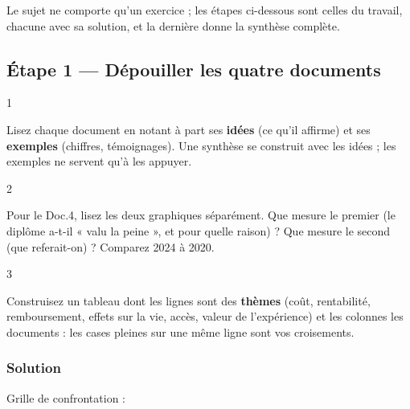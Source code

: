 \documentclass[11pt,a4paper]{article}
\begin{document}
Le sujet ne comporte qu'un exercice ; les étapes ci-dessous sont celles du travail, chacune avec sa solution, et la dernière donne la synthèse complète.

\hypertarget{uxe9tape-1-duxe9pouiller-les-quatre-documents}{%
\subsection{Étape 1 --- Dépouiller les quatre documents}\label{uxe9tape-1-duxe9pouiller-les-quatre-documents}}

\begin{indication}{1}

Lisez chaque document en notant à part ses \textbf{idées} (ce qu'il affirme) et ses \textbf{exemples} (chiffres, témoignages). Une synthèse se construit avec les idées ; les exemples ne servent qu'à les appuyer.

\end{indication}

\begin{indication}{2}

Pour le Doc.4, lisez les deux graphiques séparément. Que mesure le premier (le diplôme a-t-il « valu la peine », et pour quelle raison) ? Que mesure le second (que referait-on) ? Comparez 2024 à 2020.

\end{indication}

\begin{indication}{3}

Construisez un tableau dont les lignes sont des \textbf{thèmes} (coût, rentabilité, remboursement, effets sur la vie, accès, valeur de l'expérience) et les colonnes les documents : les cases pleines sur une même ligne sont vos croisements.

\end{indication}

\hypertarget{solution}{%
\subsubsection{Solution}\label{solution}}

Grille de confrontation :
\end{document}
